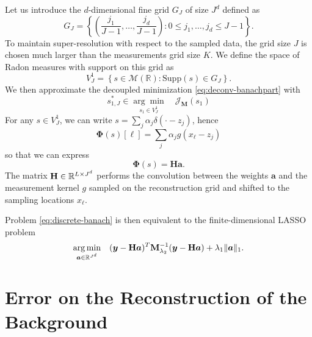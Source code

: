         Let us introduce the $d$-dimensional fine grid $G_J$ of size $J^d$ defined as
        \begin{equation*}
            G_J = \left\{ \left(\frac{j_1}{J-1}, \dots, \frac{j_d}{J-1} \right) : 0 \leq  j_1, \dots, j_d \leq J-1 \right\}.
        \end{equation*}
        To maintain super-resolution with respect to the sampled data, the grid size $J$ is chosen much larger than the measurements grid size $K$. We define the space of Radon measures with support on this grid as
        \begin{equation*}
            V^1_J = \left\{ s \in \mathcal{M}(\mathbb{R}) : \mathrm{Supp}(s) \in G_J \right\}.
        \end{equation*}
        We then approximate the decoupled minimization \eqref{eq:deconv-banachpart} with
        \begin{equation}
            \label{eq:discrete-banach}
            s_{1, J}^* \in \underset{ s_1\in V^1_J}{\arg\min} \quad \mathcal{J}_\mathbf{M}(s_1)
        \end{equation}
        For any $s \in V^1_J$, we can write $s = \sum_j \alpha_j \delta (\cdot - z_j) $, hence
        $$
        \bm{\Phi}(s)[\ell] = \sum_j \alpha_j g(x_{\ell} - z_j)
        $$
        so that we can express 
        $$
        \bm{\Phi}(s) = \mathbf{H}\bm{a}.
        $$
        The matrix $\mathbf{H} \in \mathbb{R}^{L \times J^d}$ performs the convolution between the weights $\bm{a}$ and the measurement kernel $g$ sampled on the reconstruction grid and shifted to the sampling locations $x_{\ell}$. 
        
        
        Problem \eqref{eq:discrete-banach} is then equivalent to the finite-dimensional LASSO problem
        \begin{equation*}
            \underset{ \bm{a} \in \mathbb{R}^{J^d}}{\arg\min} \quad ( \bm{y} - \mathbf{H}\bm{a}  )^T \mathbf{M}_{\lambda_{2}}^{-1} ( \bm{y} - \mathbf{H}\bm{a}  )  + \lambda_{1} \| \bm{a} \|_{1}.
        \end{equation*}    

\clearpage

\section{Error on the Reconstruction of the Background}
    \label{app:errorbg}

